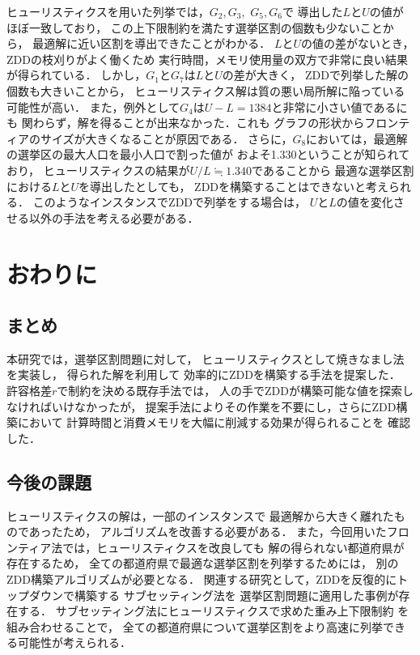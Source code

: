 \documentclass[10pt,a4paper,notitlepage,oneside,twocolumn]{abst_jsarticle}
\begin{document}
ヒューリスティクスを用いた列挙では，$G_2, G_3,$ $ G_5, G_6$で
導出した$L$と$U$の値がほぼ一致しており，
この上下限制約を満たす選挙区割の個数も少ないことから，
最適解に近い区割を導出できたことがわかる．
$L$と$U$の値の差がないとき，ZDDの枝刈りがよく働くため
実行時間，メモリ使用量の双方で非常に良い結果が得られている．
しかし，$G_1$と$G_7$は$L$と$U$の差が大きく，
ZDDで列挙した解の個数も大きいことから，
ヒューリスティクス解は質の悪い局所解に陥っている可能性が高い．
また，例外として$G_4$は$U-L=1384$と非常に小さい値であるにも
関わらず，解を得ることが出来なかった．これも
グラフの形状からフロンティアのサイズが大きくなることが原因である．
さらに，$G_8$においては，最適解の選挙区の最大人口を最小人口で割った値が
およそ1.330ということが知られており，
ヒューリスティクスの結果が$U/L\fallingdotseq1.340$であることから
最適な選挙区割における$L$と$U$を導出したとしても，
ZDDを構築することはできないと考えられる．
このようなインスタンスでZDDで列挙をする場合は，
$U$と$L$の値を変化させる以外の手法を考える必要がある．

\section{おわりに}
\subsection{まとめ}
本研究では，選挙区割問題に対して，
ヒューリスティクスとして焼きなまし法を実装し，
得られた解を利用して
効率的にZDDを構築する手法を提案した．
許容格差$r$で制約を決める既存手法では，
人の手でZDDが構築可能な値を探索しなければいけなかったが，
提案手法によりその作業を不要にし，さらにZDD構築において
計算時間と消費メモリを大幅に削減する効果が得られることを
確認した．

\subsection{今後の課題}
ヒューリスティクスの解は，一部のインスタンスで
最適解から大きく離れたものであったため，
アルゴリズムを改善する必要がある．
また，今回用いたフロンティア法では，ヒューリスティクスを改良しても
解の得られない都道府県が存在するため，
全ての都道府県で最適な選挙区割を列挙するためには，
別のZDD構築アルゴリズムが必要となる．
関連する研究として，ZDDを反復的にトップダウンで構築する
サブセッティング法を
選挙区割問題に適用した事例\cite{yamazaki}が存在する．
サブセッティング法にヒューリスティクスで求めた重み上下限制約
を組み合わせることで，
全ての都道府県について選挙区割をより高速に列挙できる可能性が考えられる．
\end{document}
